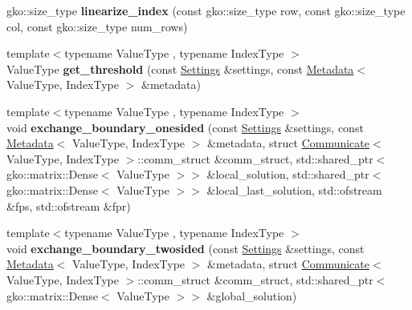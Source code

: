 \begin{DoxyCompactItemize}
\item 
\mbox{\label{namespaceschwz_a443a272fc6c66825dc7a958e824e32e3}} 
gko\+::size\+\_\+type {\bfseries linearize\+\_\+index} (const gko\+::size\+\_\+type row, const gko\+::size\+\_\+type col, const gko\+::size\+\_\+type num\+\_\+rows)
\item 
\mbox{\label{namespaceschwz_a77f43267a5630bb5e4a86e9634c69fe9}} 
{\footnotesize template$<$typename Value\+Type , typename Index\+Type $>$ }\\Value\+Type {\bfseries get\+\_\+threshold} (const \hyperlink{structschwz_1_1Settings}{Settings} \&settings, const \hyperlink{structschwz_1_1Metadata}{Metadata}$<$ Value\+Type, Index\+Type $>$ \&metadata)
\item 
\mbox{\label{namespaceschwz_a4bad22dcdd3744f7583a373a9abd265a}} 
{\footnotesize template$<$typename Value\+Type , typename Index\+Type $>$ }\\void {\bfseries exchange\+\_\+boundary\+\_\+onesided} (const \hyperlink{structschwz_1_1Settings}{Settings} \&settings, const \hyperlink{structschwz_1_1Metadata}{Metadata}$<$ Value\+Type, Index\+Type $>$ \&metadata, struct \hyperlink{classschwz_1_1Communicate}{Communicate}$<$ Value\+Type, Index\+Type $>$\+::comm\+\_\+struct \&comm\+\_\+struct, std\+::shared\+\_\+ptr$<$ gko\+::matrix\+::\+Dense$<$ Value\+Type $>$$>$ \&local\+\_\+solution, std\+::shared\+\_\+ptr$<$ gko\+::matrix\+::\+Dense$<$ Value\+Type $>$$>$ \&local\+\_\+last\+\_\+solution, std\+::ofstream \&fps, std\+::ofstream \&fpr)
\item 
\mbox{\label{namespaceschwz_a23ebc9e79127b6bb0d6e30e55ce99bfa}} 
{\footnotesize template$<$typename Value\+Type , typename Index\+Type $>$ }\\void {\bfseries exchange\+\_\+boundary\+\_\+twosided} (const \hyperlink{structschwz_1_1Settings}{Settings} \&settings, const \hyperlink{structschwz_1_1Metadata}{Metadata}$<$ Value\+Type, Index\+Type $>$ \&metadata, struct \hyperlink{classschwz_1_1Communicate}{Communicate}$<$ Value\+Type, Index\+Type $>$\+::comm\+\_\+struct \&comm\+\_\+struct, std\+::shared\+\_\+ptr$<$ gko\+::matrix\+::\+Dense$<$ Value\+Type $>$$>$ \&global\+\_\+solution)
\item 
\mbox{\label{namespaceschwz_a031a20f3e3f7eb406d4c3c9165edc449}} 
$$
\end{DoxyCompactItemize}
